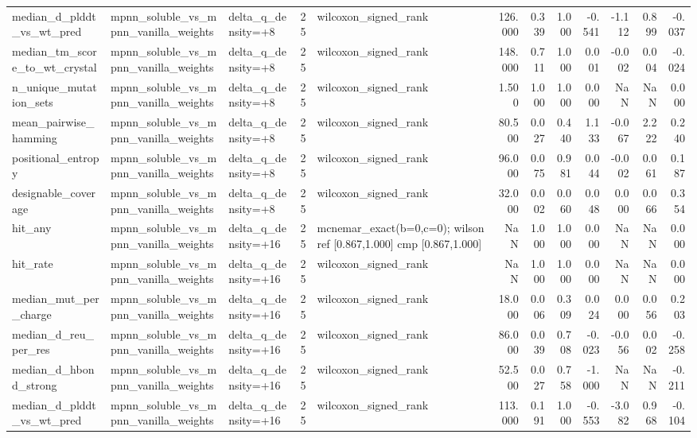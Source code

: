 \begin{table}
{\begin{tabular}{lllrlrrrrrrr}
median\_d\_plddt\_vs\_wt\_pred & mpnn\_soluble\_vs\_mpnn\_vanilla\_weights & delta\_q\_density=+8 & 25 & wilcoxon\_signed\_rank & 126.000 & 0.339 & 1.000 & -0.541 & -1.112 & 0.899 & -0.037 \\
median\_tm\_score\_to\_wt\_crystal & mpnn\_soluble\_vs\_mpnn\_vanilla\_weights & delta\_q\_density=+8 & 25 & wilcoxon\_signed\_rank & 148.000 & 0.711 & 1.000 & 0.001 & -0.002 & 0.004 & -0.024 \\
n\_unique\_mutation\_sets & mpnn\_soluble\_vs\_mpnn\_vanilla\_weights & delta\_q\_density=+8 & 25 & wilcoxon\_signed\_rank & 1.500 & 1.000 & 1.000 & 0.000 & NaN & NaN & 0.000 \\
mean\_pairwise\_hamming & mpnn\_soluble\_vs\_mpnn\_vanilla\_weights & delta\_q\_density=+8 & 25 & wilcoxon\_signed\_rank & 80.500 & 0.027 & 0.440 & 1.133 & -0.067 & 2.222 & 0.240 \\
positional\_entropy & mpnn\_soluble\_vs\_mpnn\_vanilla\_weights & delta\_q\_density=+8 & 25 & wilcoxon\_signed\_rank & 96.000 & 0.075 & 0.981 & 0.044 & -0.002 & 0.061 & 0.187 \\
designable\_coverage & mpnn\_soluble\_vs\_mpnn\_vanilla\_weights & delta\_q\_density=+8 & 25 & wilcoxon\_signed\_rank & 32.000 & 0.002 & 0.060 & 0.048 & 0.000 & 0.066 & 0.354 \\
hit\_any & mpnn\_soluble\_vs\_mpnn\_vanilla\_weights & delta\_q\_density=+16 & 25 & mcnemar\_exact(b=0,c=0); wilson ref [0.867,1.000] cmp [0.867,1.000] & NaN & 1.000 & 1.000 & 0.000 & NaN & NaN & 0.000 \\
hit\_rate & mpnn\_soluble\_vs\_mpnn\_vanilla\_weights & delta\_q\_density=+16 & 25 & wilcoxon\_signed\_rank & NaN & 1.000 & 1.000 & 0.000 & NaN & NaN & 0.000 \\
median\_mut\_per\_charge & mpnn\_soluble\_vs\_mpnn\_vanilla\_weights & delta\_q\_density=+16 & 25 & wilcoxon\_signed\_rank & 18.000 & 0.006 & 0.309 & 0.024 & 0.000 & 0.056 & 0.203 \\
median\_d\_reu\_per\_res & mpnn\_soluble\_vs\_mpnn\_vanilla\_weights & delta\_q\_density=+16 & 25 & wilcoxon\_signed\_rank & 86.000 & 0.039 & 0.708 & -0.023 & -0.056 & 0.002 & -0.258 \\
median\_d\_hbond\_strong & mpnn\_soluble\_vs\_mpnn\_vanilla\_weights & delta\_q\_density=+16 & 25 & wilcoxon\_signed\_rank & 52.500 & 0.027 & 0.758 & -1.000 & NaN & NaN & -0.211 \\
median\_d\_plddt\_vs\_wt\_pred & mpnn\_soluble\_vs\_mpnn\_vanilla\_weights & delta\_q\_density=+16 & 25 & wilcoxon\_signed\_rank & 113.000 & 0.191 & 1.000 & -0.553 & -3.082 & 0.968 & -0.104 \\

\end{tabular}}
\end{table}
